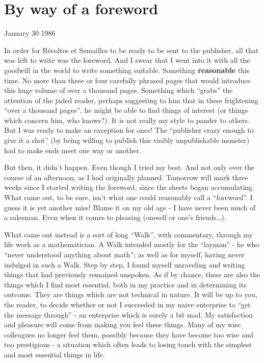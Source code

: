 \begin{comment}
\documentclass{book}
\usepackage{master}
\newcommand{\rec}{$\text{R\'ecoltes et Semailles}$}
\newcommand{\no}{n$^\circ$}
\hfuzz = 100pt

\end{comment}

\chapter{By way of a foreword}
\label{chapter:1}

January 30 1986

In order for R\'ecoltes et Semailles to be ready to be sent to the publisher, all that was left to write was the foreword.
And I swear that I went into it with all the goodwill in the world to write something suitable. 
Something \textbf{reasonable} this time. No more than three or four carefully phrased pages that would introduce this huge volume of over a thousand
pages. Something which ``grabs'' the attention of the jaded reader, 
perhaps suggesting to him that in these frightening ``over a thousand pages'', he might be able to find
things of interest (or things which concern him, who knows?). It is not
really my style to pander to others. But I was ready to make an exception for once!
The ``publisher crazy enough to give it a shot'' (by being willing to publish this visibly unpublishable
monster) had to make ends meet one way or another. 

But then, it didn't happen. Even though I tried my best. And not only over the course of an afternoon, as I had
originally planned. Tomorrow will mark three weeks since I started writing the foreword, since the sheets began
accumulating.
What came out, to be sure, isn't what one could reasonably call a ``foreword''.
I guess it is yet another miss! Blame it on my old age - I have never been much of a salesman. Even when
it comes to pleasing (oneself or one's friends\ldots).

What came out instead is a sort of long ``Walk'', with commentary, through my life work as a mathematician. 
A Walk intended mostly for the ``layman'' - he who ``never understood anything about
math''; as well as for myself, having never indulged in such a Walk. 
Step by step, I found myself unraveling and writing things that had previously remained
unspoken. As if by chance, these are also the things which I find most essential, both in
my practice and in determining its outcome. 
They are things which are not technical in nature. It will be up to you, the reader, to decide whether
or not I succeeded in my naive enterprise to ``get the message through'' - an enterprise
which is surely a bit mad. 
My satisfaction and pleasure will come from making you feel these things. Many of my wise colleagues no longer feel them, 
possibly because they have become too wise
and too prestigious - a situation which often leads to losing touch with the simplest and most essential things in life. 

